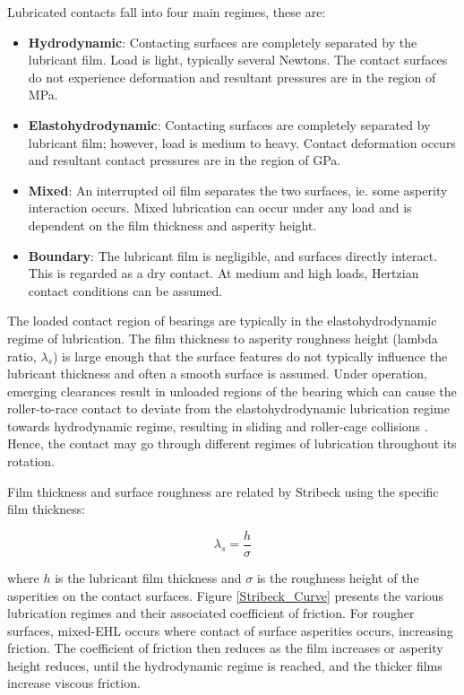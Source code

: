 Lubricated contacts fall into four main regimes, these are:

\begin{itemize}
	\item \textbf{Hydrodynamic}: Contacting surfaces are completely separated by the lubricant film. Load is light, typically several Newtons. The contact surfaces do not experience deformation and resultant pressures are in the region of MPa.
	\item \textbf{Elastohydrodynamic}: Contacting surfaces are completely separated by lubricant film; however, load is medium to heavy. Contact deformation occurs and resultant contact pressures are in the region of GPa.
	\item \textbf{Mixed}: An interrupted oil film separates the two surfaces, ie. some asperity interaction occurs. Mixed lubrication can occur under any load and is dependent on the film thickness and asperity height.
	\item \textbf{Boundary}: The lubricant film is negligible, and surfaces directly interact. This is regarded as a dry contact. At medium and high loads, Hertzian contact conditions can be assumed.
\end{itemize}

The loaded contact region of bearings are typically in the elastohydrodynamic regime of lubrication. The film thickness to asperity roughness height (lambda ratio, $\lambda_s$) is large enough that the surface features do not typically influence the lubricant thickness and often a smooth surface is assumed. Under operation, emerging clearances result in unloaded regions of the bearing which can cause the roller-to-race contact to deviate from the elastohydrodynamic lubrication regime towards hydrodynamic regime, resulting in sliding and roller-cage collisions \cite{Mohammadpour2015c}. Hence, the contact may go through different regimes of lubrication throughout its rotation.

Film thickness and surface roughness are related by Stribeck \cite{Stribeck1907} using the specific film thickness:

\begin{equation}\label{eq2.5}
	\lambda_s=\frac{h}{\sigma}
\end{equation}
 
 where $h$ is the lubricant film thickness and $\sigma$ is the roughness height of the asperities on the contact surfaces. Figure \ref{Stribeck_Curve} presents the various lubrication regimes and their associated coefficient of friction. For rougher surfaces, mixed-EHL occurs where contact of surface asperities occurs, increasing friction. The coefficient of friction then reduces as the film increases or asperity height reduces, until the hydrodynamic regime is reached, and the thicker films increase viscous friction.

